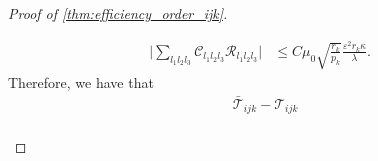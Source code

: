 \documentclass[10pt]{article}
\newcommand{\0}{{\mathbf{0}}}
\newcommand{\1}{{\mathbf{1}}}
\newcommand{\U}{{\mathbf{U}}}
\renewcommand{\t}{^{\top}}
\newcommand{\eps}{\varepsilon}
\begin{document}
\begin{proof}[Proof of \cref{thm:efficiency_order_ijk}]
\begin{itemize}
\begin{align*}
    \bigg| \sum_{l_1l_2l_3} \mathcal{C}_{l_1l_2l_3} \mathcal{R}_{l_1l_2l_3} \bigg| &\leq C \mu_0 \sqrt{\frac{r_k}{p_k}} \frac{\eps^2 r_k \kappa }{\lambda}.
\end{align*}
Therefore, we have that
\begin{align*}
    & \mathcal{\bar T}_{ijk} - \mathcal{T}_{ijk} \\

\end{align*}
\end{itemize}
\end{proof}
\end{document}
